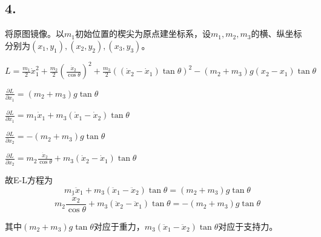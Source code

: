 \documentclass{ctexart}
\begin{document}
\subsection*{4.}
将原图镜像。以$m_1$初始位置的楔尖为原点建坐标系，设$m_1,m_2,m_3$的横、纵坐标分别为$(x_1,y_1),(x_2,y_2),(x_3,y_3)$。

$L=\frac{m_1}{2}\dot{x}_1^2+\frac{m_2}{2}(\frac{\dot{x}_2}{\cos\theta})^2+\frac{m_3}{2}((\dot{x}_2-\dot{x}_1)\tan\theta)^2-(m_2+m_3)g(x_2-x_1)\tan\theta$

$\frac{\partial L}{\partial x_{1}}=(m_2+m_3)g\tan\theta$

$\frac{\partial L}{\partial \dot{x}_1}=m_1\dot{x}_1+m_3(\dot{x}_1-\dot{x}_2)\tan\theta$

$\frac{\partial L}{\partial x_2}=-(m_2+m_3)g\tan\theta$

$\frac{\partial L}{\partial \dot{x}_2}=m_2 \frac{\dot{x}_2}{\cos\theta}+m_3(\dot{x}_2-\dot{x}_1)\tan\theta$

故E-L方程为
\[m_1\ddot{x}_1+m_3(\ddot{x}_1-\ddot{x}_{2})\tan\theta=(m_2+m_3)g\tan\theta\]
\[m_2 \frac{\ddot{x}_2}{\cos\theta}+m_3(\ddot{x}_2-\ddot{x}_1)\tan\theta=-(m_2+m_3)g\tan\theta \]

其中$(m_2+m_3)g\tan\theta$对应于重力，$m_3(\ddot{x}_1-\ddot{x}_2)\tan\theta$对应于支持力。
\end{document}
